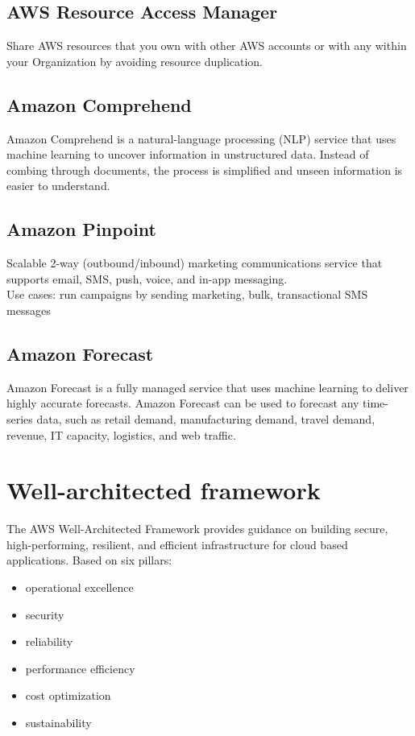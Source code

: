 \documentclass[12pt, letterpaper, twoside]{article}
\begin{document}
\subsection{AWS Resource Access Manager}
Share AWS resources that you own with other AWS accounts or with any within your Organization by avoiding 
resource duplication.\\

\subsection{Amazon Comprehend}
Amazon Comprehend is a natural-language processing (NLP) service that uses machine learning to uncover information in 
unstructured data. Instead of combing through documents, the process is simplified and unseen information is easier 
to understand.\\

\subsection{Amazon Pinpoint}
Scalable 2-way (outbound/inbound) marketing communications service that supports email, SMS, push, voice, 
and in-app messaging.\\
Use cases: run campaigns by sending marketing, bulk, transactional SMS messages


\subsection{Amazon Forecast}
Amazon Forecast is a fully managed service that uses machine learning to deliver highly accurate forecasts. 
Amazon Forecast can be used to forecast any time-series data, such as retail demand, manufacturing demand, travel demand, revenue, 
IT capacity, logistics, and web traffic.\\

\section{Well-architected framework}
The AWS Well-Architected Framework provides guidance on building secure, high-performing, resilient, and efficient infrastructure 
for cloud based applications. Based on six pillars:
\begin{itemize}
	\item operational excellence
	\item security
	\item reliability
	\item performance efficiency
	\item cost optimization
	\item sustainability
\end{itemize}
\end{document}
